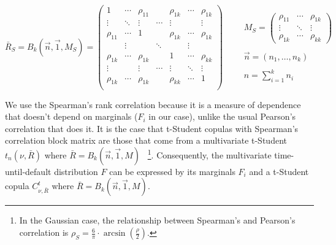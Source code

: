 \documentclass[11pt,fleqn]{book} %
\begin{document}
\begin{displaymath}
	\bar{R}_S = B_k(\vec{n},\vec{1},M_S) = 
	\left(
	\begin{array}{ccccccc}
		1         & \cdots & \rho_{11} &        & \rho_{1k} & \cdots & \rho_{1k} \\
		\vdots    & \ddots & \vdots    & \cdots & \vdots    &        & \vdots    \\
		\rho_{11} & \cdots & 1         &        & \rho_{1k} & \cdots & \rho_{1k} \\
		
		          & \vdots &           & \ddots &           & \vdots &           \\
		
		\rho_{1k} & \cdots & \rho_{1k} &        & 1         & \cdots & \rho_{kk} \\
		\vdots    &        & \vdots    & \cdots & \vdots    & \ddots & \vdots    \\
		\rho_{1k} & \cdots & \rho_{1k} &        & \rho_{kk} & \cdots & 1         \\
	\end{array}
	\right)
	\qquad 
	\begin{array}{l}
		M_S = 
		\left(
		\begin{array}{ccc}
			\rho_{11} & \cdots & \rho_{1k} \\
			\vdots    & \ddots & \vdots    \\
			\rho_{1k} & \cdots & \rho_{kk}
		\end{array}
		\right) \\
		\\
		\vec{n} = (n_1,\dots,n_k) \\
		\\
		n = \displaystyle \sum_{i=1}^{k} n_i
	\end{array}
\end{displaymath}

We use the Spearman's rank correlation because it is a measure of dependence 
that doesn't depend on marginals ($F_i$ in our case), unlike the usual
Pearson's correlation that does it. It is the case that t-Student copulas with 
Spearman's correlation block matrix are those that come from a multivariate 
t-Student $t_n(\nu,\bar{R})$ where $\bar{R} = B_k(\vec{n},\vec{1},M)$~
\footnote{ In the Gaussian case, the relationship between Spearman's 
and Pearson's correlation is $\rho_S = \frac{6}{\pi}\cdot \arcsin(\frac{\rho}{2})$.}.
Consequently, the multivariate time-until-default distribution $F$ can be 
expressed by its marginals $F_i$ and a t-Student copula $C_{\nu,\bar{R}}^t$
where $\bar{R} = B_k(\vec{n},\vec{1},M)$.
\end{document}
